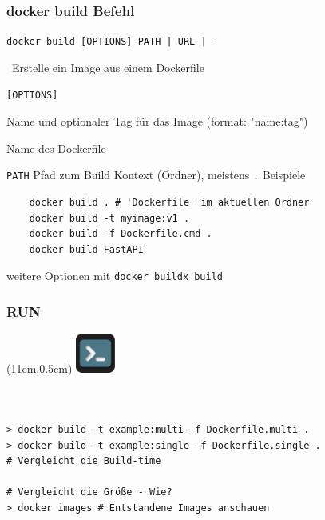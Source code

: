 \documentclass[22pt]{beamer}
\newcommand{\code}[1]{\colorbox{gray!10}{\texttt{#1}}}
\newcommand{\desclabel}[1]{\textcolor{cyan}{#1}}
\newcommand{\terminal}{
    \begin{textblock*}{1.3cm}(11cm,0.5cm) %
    \includegraphics[width=1.3cm]{Bilder/terminal2.png}
    \end{textblock*}
}
\begin{document}
\begin{frame}[fragile]
    \frametitle{docker build Befehl}
    \code{docker build [OPTIONS] PATH | URL | -} 
    
    \-  \ Erstelle ein Image aus einem Dockerfile\vspace{5pt}
    
    \code{[OPTIONS]}
    \begin{description}[labelindent=0.5cm, style=unboxed, labelwidth=\widthof{-f, -\,-file string}, leftmargin=!]
        \item[\desclabel{-t, -\,-tag stringArray}] Name und optionaler Tag für das Image (format: "name:tag")
        \item[\desclabel{-f, -\,-file string}] Name des Dockerfile
        \item[...] 
    \end{description}
    
    \code{PATH} Pfad zum Build Kontext (Ordner), meistens \code{.}
    \pause
    Beispiele
    \begin{verbatim}
    docker build . # 'Dockerfile' im aktuellen Ordner
    docker build -t myimage:v1 . 
    docker build -f Dockerfile.cmd . 
    docker build FastAPI
    \end{verbatim}
    \medskip

    {\small weitere Optionen mit \code{docker buildx build}}
\end{frame}

\begin{frame}[fragile, b]
    \frametitle{RUN}
    \terminal
    \begin{columns}
        \begin{column}{0.5\textwidth}
            \inputminted[fontsize=\scriptsize, frame=lines]{dockerfile}{../examples/Dockerfile.multi}
        \end{column}
        \begin{column}{0.5\textwidth}
            \inputminted[fontsize=\scriptsize, frame=lines]{dockerfile}{../examples/Dockerfile.single}
        \end{column}
    \end{columns}
    \medskip\pause
\begin{verbatim}
> docker build -t example:multi -f Dockerfile.multi .
> docker build -t example:single -f Dockerfile.single .
# Vergleicht die Build-time

# Vergleicht die Größe - Wie?
> docker images # Entstandene Images anschauen

\end{verbatim}
\end{frame}
\end{document}
